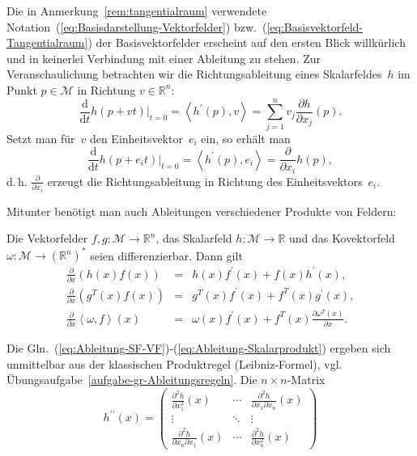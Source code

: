 \begin{remark}
\label{rem:Notation-Basis-Vektorfelder}Die
in Anmerkung~\ref{rem:tangentialraum} verwendete Notation~(\ref{eq:Basisdarstellung-Vektorfelder})
bzw.~(\ref{eq:Basisvektorfeld-Tangentialraum}) der Basisvektorfelder
erscheint auf den ersten Blick willkürlich und in keinerlei Verbindung
mit einer Ableitung zu stehen. Zur Veranschaulichung betrachten wir
die Richtungsableitung eines Skalarfeldes~$h$ im Punkt $p\in\mathcal{M}$
in Richtung $v\in{\mathbb{R}}^{n}$:
\[
\frac{{\mathrm{d}}}{{\mathrm{d}} t}\left.h(p+vt)\right|_{t=0}=\left\langle h^{\prime}(p),v\right\rangle =\sum_{j=1}^{n}v_{j}\frac{\partial h}{\partial x_{j}}(p).
\]
Setzt man für~$v$ den Einheitsvektor~$e_{i}$ ein, so erhält man
\[
\frac{{\mathrm{d}}}{{\mathrm{d}} t}\left.h(p+e_{i}t)\right|_{t=0}=\left\langle h^{\prime}(p),e_{i}\right\rangle =\frac{\partial}{\partial x_{i}}h(p),
\]
d.\,h. $\frac{\partial}{\partial x_{i}}$ erzeugt die Richtungsableitung
in Richtung des Einheitsvektors~$e_{i}$.
\end{remark}
Mitunter benötigt man auch Ableitungen verschiedener Produkte von
Feldern:
\begin{proposition}
\label{pro:Ableitungsregeln-Felder}Die Vektorfelder $f,g:\mathcal{M}{\to{\mathbb{R}}}^{n}$,
das Skalarfeld $h:\mathcal{M}\to{\mathbb{R}}$ und das Kovektorfeld $\omega:\mathcal{M}\to({\mathbb{R}}^{n})^{*}$
seien differenzierbar. Dann gilt \begin{subequations}\label{eq:Ableitungsregeln}
\begin{eqnarray}
\frac{\partial}{\partial x}\left(h(x)f(x)\right) & = & h(x)f^{\prime}(x)+f(x)h^{\prime}(x),\label{eq:Ableitung-SF-VF}\\
\frac{\partial}{\partial x}\left(g^{T}(x)f(x)\right) & = & g^{T}(x)f^{\prime}(x)+f^{T}(x)g^{\prime}(x),\label{eq:Ableitung-VF-VF}\\
\frac{\partial}{\partial x}\left\langle \omega,f\right\rangle (x) & = & \omega(x)f^{\prime}(x)+f^{T}(x)\frac{\partial\omega^{T}(x)}{\partial x}.\label{eq:Ableitung-Skalarprodukt}
\end{eqnarray}
\end{subequations}
\end{proposition}
Die Gln.~(\ref{eq:Ableitung-SF-VF})-(\ref{eq:Ableitung-Skalarprodukt})
ergeben sich unmittelbar aus der klassischen Produktregel (Leibniz-Formel),
vgl. Übungsaufgabe~\ref{aufgabe-gr-Ableitungsregeln}.
Die $n\times n$-Matrix
\[
h^{\prime\prime}(x)=\left(\begin{array}{ccc}
\frac{\partial^{2}h}{\partial x_{1}^{2}}(x) & \cdots & \frac{\partial^{2}h}{\partial x_{1}\partial x_{n}}(x)\\
\vdots & \ddots & \vdots\\
\frac{\partial^{2}h}{\partial x_{n}\partial x_{1}}(x) & \cdots & \frac{\partial^{2}h}{\partial x_{n}^{2}}(x)
\end{array}\right)
\]
